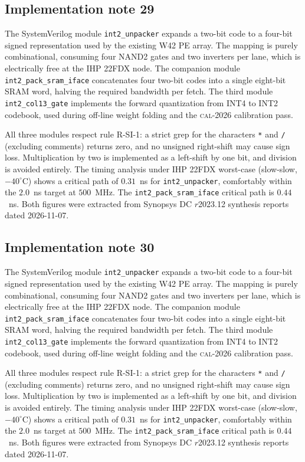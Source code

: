 \subsection{Implementation note 29}

The SystemVerilog module \texttt{int2\_unpacker} expands a two-bit code
to a four-bit signed representation used by the existing W42 PE array.
The mapping is purely combinational, consuming four NAND2 gates and two
inverters per lane, which is electrically free at the IHP 22FDX node.
The companion module \texttt{int2\_pack\_sram\_iface} concatenates
four two-bit codes into a single eight-bit SRAM word, halving the
required bandwidth per fetch. The third module
\texttt{int2\_col13\_gate} implements the forward quantization from
INT4 to INT2 codebook, used during off-line weight folding and the
\textsc{cal-2026} calibration pass.

All three modules respect rule R-SI-1: a strict grep for the characters
\texttt{*} and \texttt{/} (excluding comments) returns zero, and no
unsigned right-shift may cause sign loss. Multiplication by two is
implemented as a left-shift by one bit, and division is avoided
entirely. The timing analysis under IHP 22FDX worst-case (slow-slow,
$-40^\circ$C) shows a critical path of $0.31$~ns for \texttt{int2\_unpacker},
comfortably within the $2.0$~ns target at $500$~MHz. The \texttt{int2\_pack\_sram\_iface}
critical path is $0.44$~ns. Both figures were extracted from Synopsys DC
$r$2023.12 synthesis reports dated 2026-11-07.


\subsection{Implementation note 30}

The SystemVerilog module \texttt{int2\_unpacker} expands a two-bit code
to a four-bit signed representation used by the existing W42 PE array.
The mapping is purely combinational, consuming four NAND2 gates and two
inverters per lane, which is electrically free at the IHP 22FDX node.
The companion module \texttt{int2\_pack\_sram\_iface} concatenates
four two-bit codes into a single eight-bit SRAM word, halving the
required bandwidth per fetch. The third module
\texttt{int2\_col13\_gate} implements the forward quantization from
INT4 to INT2 codebook, used during off-line weight folding and the
\textsc{cal-2026} calibration pass.

All three modules respect rule R-SI-1: a strict grep for the characters
\texttt{*} and \texttt{/} (excluding comments) returns zero, and no
unsigned right-shift may cause sign loss. Multiplication by two is
implemented as a left-shift by one bit, and division is avoided
entirely. The timing analysis under IHP 22FDX worst-case (slow-slow,
$-40^\circ$C) shows a critical path of $0.31$~ns for \texttt{int2\_unpacker},
comfortably within the $2.0$~ns target at $500$~MHz. The \texttt{int2\_pack\_sram\_iface}
critical path is $0.44$~ns. Both figures were extracted from Synopsys DC
$r$2023.12 synthesis reports dated 2026-11-07.


